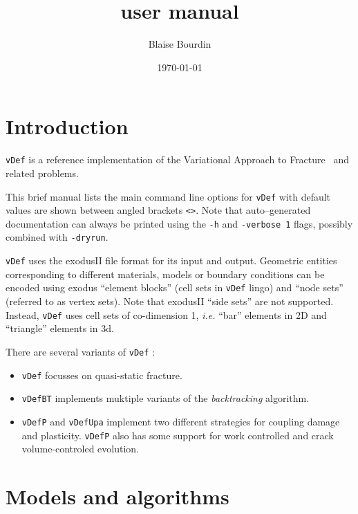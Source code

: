 \documentclass[10pt,oneside]{report}
\title{\vDef user manual}
\author{Blaise Bourdin}
\date{\today}
\def\vDef{{\texttt{vDef}} }
\def\vDefBT{{\texttt{vDefBT}} }
\def\vDefP{{\texttt{vDefP}} }
\def\vDefUPA{{\texttt{vDefUpa}} }
\begin{document}

\maketitle

\tableofcontents
\chapter*{Introduction}
\vDef is a reference implementation of the Variational Approach to Fracture~\cite{Francfort-Marigo-1998,Bourdin-Francfort-EtAl-2008b} and related problems. 
 
 

This brief manual lists the main command line options for \vDef with default values are shown between angled brackets \verb+<>+. Note that auto--generated documentation can always be printed using the \texttt{-h} and  \texttt{-verbose 1} flags, possibly combined with \texttt{-dryrun}.


\vDef uses the exodusII file format for its input and output. Geometric entities corresponding to different materials, models or boundary conditions can be encoded using exodus ``element blocks'' (cell sets in \vDef lingo) and ``node sets'' (referred to as vertex sets). Note that exodusII ``side sets'' are not supported. Instead, \vDef uses cell sets of co-dimension 1, \emph{i.e.} ``bar'' elements in 2D and ``triangle'' elements in 3d.

There are several variants of \vDef:
\begin{itemize}
    \item \vDef focusses on quasi-static fracture.
    \item \vDefBT implements muktiple variants of the \emph{backtracking} algorithm.
    \item \vDefP and \vDefUPA implement two different strategies for coupling damage and plasticity. \vDefP also has some support for work controlled and crack volume-controled evolution.
\end{itemize}
\newpage
\chapter{Models and algorithms}
\end{document}
